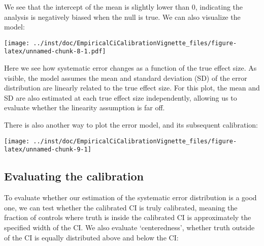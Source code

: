 \documentclass[]{article}
\newenvironment{Shaded}{\begin{snugshade}}{\end{snugshade}}
\newcommand{\KeywordTok}[1]{\textcolor[rgb]{0.13,0.29,0.53}{\textbf{#1}}}
\newcommand{\NormalTok}[1]{#1}
\newcommand{\OperatorTok}[1]{\textcolor[rgb]{0.81,0.36,0.00}{\textbf{#1}}}
\begin{document}
We see that the intercept of the mean is slightly lower than 0,
indicating the analysis is negatively biased when the null is true. We
can also visualize the model:

\begin{Shaded}
\end{Shaded}

\texttt{[image: ../inst/doc/EmpiricalCiCalibrationVignette\_files/figure-latex/unnamed-chunk-8-1.pdf]}

Here we see how systematic error changes as a function of the true
effect size. As visible, the model assumes the mean and standard
deviation (SD) of the error distribution are linearly related to the
true effect size. For this plot, the mean and SD are also estimated at
each true effect size independently, allowing us to evaluate whether the
linearity assumption is far off.

There is also another way to plot the error model, and its subsequent
calibration:

\begin{Shaded}
\end{Shaded}

\texttt{[image: ../inst/doc/EmpiricalCiCalibrationVignette\_files/figure-latex/unnamed-chunk-9-1]}

\hypertarget{evaluating-the-calibration}{%
\subsection{Evaluating the
calibration}\label{evaluating-the-calibration}}

To evaluate whether our estimation of the systematic error distribution
is a good one, we can test whether the calibrated CI is truly
calibrated, meaning the fraction of controls where truth is inside the
calibrated CI is approximately the specified width of the CI. We also
evaluate `centeredness', whether truth outside of the CI is equally
distributed above and below the CI:
\end{document}
